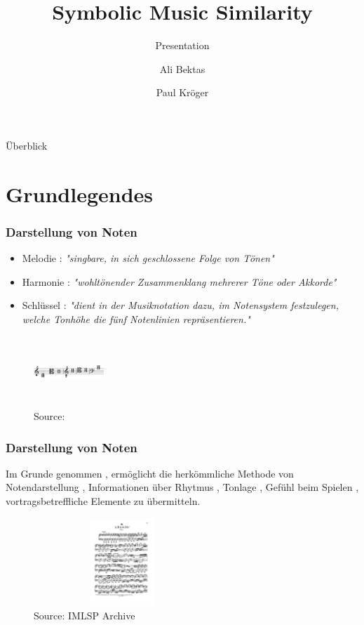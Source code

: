 \documentclass{beamer}
\title{Symbolic Music Similarity}
\subtitle{Presentation}
\author{Ali Bektas \and Paul Kröger}
\begin{document}
	

	\begin{frame}\maketitle \end{frame}
	\begin{frame}{Überblick} \tableofcontents \end{frame}

	\section{Grundlegendes}

	\begin{frame}
  		\frametitle{Darstellung von Noten}
  		\begin{minipage}{0.45\textwidth}
  			\begin{itemize}
			\item Melodie : \textit{"singbare, in sich geschlossene Folge von Tönen"} \cite{duden_melodie}
			\item Harmonie : \textit{"wohltönender Zusammenklang mehrerer Töne oder Akkorde"} \cite{duden_harmonie}
			\item Schlüssel : \textit{"dient in der Musiknotation dazu, im Notensystem festzulegen, welche Tonhöhe die fünf Notenlinien repräsentieren."} \cite{def_schlussel}
			\end{itemize}
		\end{minipage}%
		\begin{minipage}{0.45\textwidth}
			\begin{figure}[h!]
				\includegraphics[width=100px,height=100px,keepaspectratio]{Clefs_chord}
				\caption{Source: \cite{def_schlussel}}
			\end{figure}
		\end{minipage}
	\end{frame}

	\begin{frame}
		\frametitle{Darstellung von Noten}
		Im Grunde genommen , ermöglicht die herkömmliche Methode von Notendarstellung , Informationen über Rhytmus , Tonlage , Gefühl beim Spielen , vortragsbetreffliche Elemente zu übermitteln.
		\begin{figure}[h!]
			\includegraphics[width=250px,height=125px,keepaspectratio]{bach_adagio}
			\caption{Source: IMLSP Archive}
		\end{figure}
	\end{frame}
\end{document}
